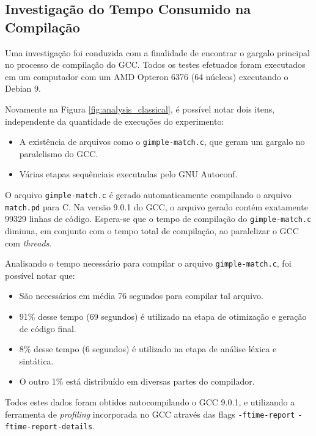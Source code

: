 \subsection{Investigação do Tempo Consumido na Compilação}

Uma investigação foi conduzida com a finalidade de encontrar o gargalo
principal no processo de compilação do GCC. Todos os testes efetuados foram
executados em um computador com um AMD Opteron 6376 (64 núcleos) executando
o Debian 9.

Novamente na Figura \ref{fig:analysis_classical}, é possível notar dois
itens, independente da quantidade de execuções do experimento:

\begin{itemize}
    \item A existência de arquivos como o \texttt{gimple-match.c}, que
        geram um gargalo no paralelismo do GCC.

    \item Várias etapas sequênciais executadas pelo GNU Autoconf.
\end{itemize}

O arquivo \texttt{gimple-match.c} é gerado automaticamente compilando
o arquivo \texttt{match.pd} para C. Na versão 9.0.1 do GCC, o arquivo
gerado contém exatamente 99329 linhas de código. Espera-se que o tempo
de compilação do \texttt{gimple-match.c} diminua, em conjunto com o tempo
total de compilação, ao paralelizar o GCC com \textit{threads}.

Analisando o tempo necessário para compilar o arquivo \texttt{gimple-match.c},
foi possível notar que:
\begin{itemize}
    \item São necessários em média 76 segundos para compilar tal arquivo.

    \item 91\% desse tempo (69 segundos) é utilizado na etapa de otimização
        e geração de código final.

    \item 8\% desse tempo (6 segundos) é utilizado na etapa de análise léxica
        e sintática.

    \item O outro 1\% está distribuído em diversas partes do compilador.
\end{itemize}
Todos estes dados foram obtidos autocompilando o GCC 9.0.1, e utilizando a
ferramenta de \textit{profiling} incorporada
no GCC através das flags \texttt{-ftime-report} \texttt{-ftime-report-details}.


